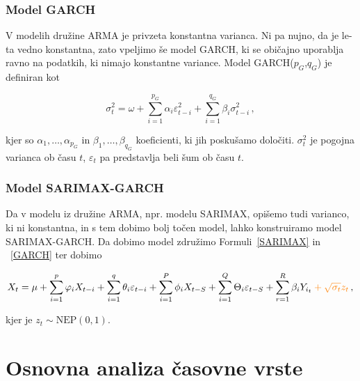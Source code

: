 \documentclass[a4paper, 11pt]{article}
\begin{document}
\subsubsection{Model GARCH}

V modelih družine ARMA je privzeta konstantna varianca. Ni pa nujno, da je le-ta vedno konstantna, zato
vpeljimo še model GARCH, ki se običajno uporablja ravno na podatkih, ki nimajo konstantne variance. 
Model GARCH($p_G$,$q_G$) je definiran kot

\begin{equation}
    \label{GARCH}
    \sigma^2_t = \omega + \sum_{i=1}^{p_G}{\alpha_i \varepsilon_{t-i}^2} + \sum_{i=1}^{q_G}{\beta_i \sigma_{t-i}^2} \,,
\end{equation}

\noindent kjer so $\alpha_1, \dots, \alpha_{p_G}$ in $\beta_1, \dots, \beta_{q_G}$ koeficienti, ki 
jih poskušamo določiti. $\sigma^2_t$ je pogojna varianca ob času $t$, $\varepsilon_t$ pa predstavlja beli šum
ob času $t$. \cite{ArimaGarch}

\subsubsection{Model SARIMAX-GARCH}

\noindent Da v modelu iz družine ARMA, npr. modelu SARIMAX, opišemo tudi varianco, ki ni konstantna, in s tem dobimo bolj
točen model, lahko 
konstruiramo model SARIMAX-GARCH. Da dobimo model združimo Formuli~\eqref{SARIMAX} in ~\eqref{GARCH} ter dobimo

\begin{equation}
    \label{SARIMAX_GARCH}
    X_t = \mu + \sum_{i=1}^{p}{\varphi_i X_{t-i}} + \sum_{i=1}^{q}{\theta_i \varepsilon_{t-i}} + \sum_{i=1}^{P}{\phi_i X_{t-S}} + \sum_{i=1}^{Q}{\Theta_i \varepsilon_{t-S}}  + \sum_{r=1}^{R}{\beta_i Y_{i_{t}}} \color{orange} + \sqrt{\sigma_t} z_t \color{black} \,,
\end{equation}

\noindent kjer je $z_t \sim \text{NEP}(0,1)$. \cite{ArimaGarch}




\pagebreak

\section{Osnovna analiza časovne vrste}
\end{document}
